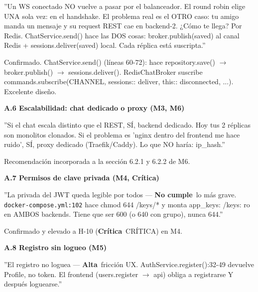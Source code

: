 \documentclass[10pt,a4paper]{article}
\newcommand{\code}[1]{\nolinkurl{#1}}
\newcommand{\badgeCritica}{\colorbox{red!20}{\textcolor{red!80!black}{\textbf{\footnotesize Crítica}}}}
\newcommand{\badgeAlta}{\colorbox{orange!20}{\textcolor{orange!90!black}{\textbf{\footnotesize Alta}}}}
\newcommand{\badgeNoCumple}{\colorbox{red!20}{\textcolor{red!80!black}{\textbf{\footnotesize No cumple}}}}
\begin{document}
''Un WS conectado NO vuelve a pasar por el balanceador. El round robin elige UNA sola vez: en el handshake. El problema real es el OTRO caso: tu amigo manda un mensaje y su request REST cae en backend-2. ¿Cómo te llega? Por Redis. ChatService.send() hace las DOS cosas: broker.publish(saved) al canal Redis + sessions.deliver(saved) local. Cada réplica está suscripta.''\par\vspace{0.4em}
Confirmado. ChatService.send() (líneas 60-72): hace repository.save() $\rightarrow$ broker.publish() $\rightarrow$ sessions.deliver(). RedisChatBroker suscribe commands.subscribe(CHANNEL, sessions:: deliver, this:: disconnected, ...). Excelente diseño.\par\vspace{0.4em}
\vspace{0.6em}\noindent\textbf{\normalsize A.6 Escalabilidad: chat dedicado o proxy (M3, M6)}\par\vspace{0.2em}
''Si el chat escala distinto que el REST, SÍ, backend dedicado. Hoy tus 2 réplicas son monolitos clonados. Si el problema es 'nginx dentro del frontend me hace ruido', SÍ, proxy dedicado (Traefik/Caddy). Lo que NO haría: ip\_hash.''\par\vspace{0.4em}
Recomendación incorporada a la sección 6.2.1 y 6.2.2 de M6.\par\vspace{0.4em}
\vspace{0.6em}\noindent\textbf{\normalsize A.7 Permisos de clave privada (M4, Crítica)}\par\vspace{0.2em}
''La privada del JWT queda legible por todos --- \badgeNoCumple\  lo más grave. \code{docker-compose.yml:102} hace chmod 644 /keys/* y monta app\_keys: /keys: ro en AMBOS backends. Tiene que ser 600 (o 640 con grupo), nunca 644.''\par\vspace{0.4em}
Confirmado y elevado a H-10 (\badgeCritica\  CRÍTICA) en M4.\par\vspace{0.4em}
\vspace{0.6em}\noindent\textbf{\normalsize A.8 Registro sin logueo (M5)}\par\vspace{0.2em}
''El registro no loguea --- \badgeAlta\  fricción UX. AuthService.register():32-49 devuelve Profile, no token. El frontend (users.register $\rightarrow$ api) obliga a registrarse Y después loguearse.''\par\vspace{0.4em}
\end{document}
